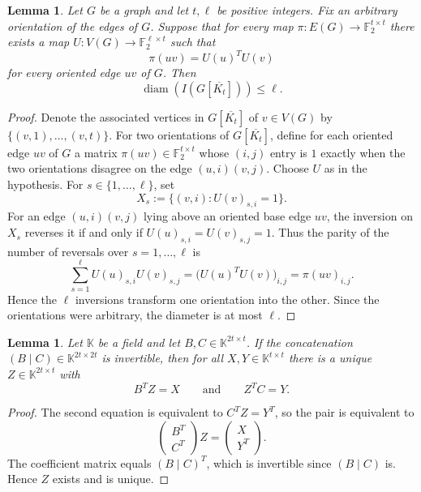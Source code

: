 \documentclass[11pt]{article}
\newtheorem{lemma}[theorem]{Lemma}
\theoremstyle{remark}
\DeclareMathOperator{\diam}{diam}
\newcommand{\F}{\mathbb{F}}
\newcommand{\K}{\mathbb{K}}
\begin{document}
\begin{lemma}\label{lem:matrix-product}
Let $G$ be a graph and let $t,\ell$ be positive integers.
Fix an arbitrary orientation of the edges of $G$.
Suppose that for every map
$\pi:E(G)\to\F_2^{t\times t}$ there exists a map
$U:V(G)\to\F_2^{\ell\times t}$ such that
\[
  \pi(uv)=U(u)^T U(v)
\]
for every oriented edge $uv$ of $G$.
Then
\[
  \diam(I(G[\overline{K_t}]))\le \ell.
\]
\end{lemma}

\begin{proof}
Denote the associated vertices in $G[\overline{K_t}]$ of $v\in V(G)$ by  $\{(v,1),\ldots,(v,t)\}$.
For two orientations of $G[\overline{K_t}]$, define for each oriented edge $uv$ of $G$ a matrix
$\pi(uv)\in\F_2^{t\times t}$ whose $(i,j)$ entry is $1$ exactly when the two orientations disagree on the edge $(u,i)(v,j)$.
Choose $U$ as in the hypothesis.
For $s\in\{1,\ldots,\ell\}$, set
\[
  X_s:=\{(v,i): U(v)_{s,i}=1\}.
\]
For an edge $(u,i)(v,j)$ lying above an oriented base edge $uv$, the inversion on $X_s$ reverses it if and only if
$U(u)_{s,i}=U(v)_{s,j}=1$.
Thus the parity of the number of reversals over $s=1,
\ldots,\ell$ is
\[
  \sum_{s=1}^{\ell} U(u)_{s,i}U(v)_{s,j}
  =\bigl(U(u)^T U(v)\bigr)_{i,j}
  =\pi(uv)_{i,j}.
\]
Hence the $\ell$ inversions transform one orientation into the other.
Since the orientations were arbitrary, the diameter is at most $\ell$.
\end{proof}

\begin{lemma}\label{lem:two-equations}
Let $\K$ be a field and let $B,C\in \K^{2t\times t}$.
If the concatenation $(B\mid C)\in \K^{2t\times2t}$ is invertible, then for all $X,Y\in \K^{t\times t}$ there is a unique $Z\in \K^{2t\times t}$ with
\[
  B^T Z=X
  \qquad\text{and}\qquad
  Z^T C=Y.
\]
\end{lemma}

\begin{proof}
The second equation is equivalent to $C^T Z=Y^T$, so the pair is equivalent to
\[
  \begin{pmatrix}B^T\\ C^T\end{pmatrix}Z
  =
  \begin{pmatrix}X\\ Y^T\end{pmatrix}.
\]
The coefficient matrix equals $(B\mid C)^T$, which is invertible since $(B\mid C)$ is. Hence $Z$ exists and is unique.
\end{proof}
\end{document}

